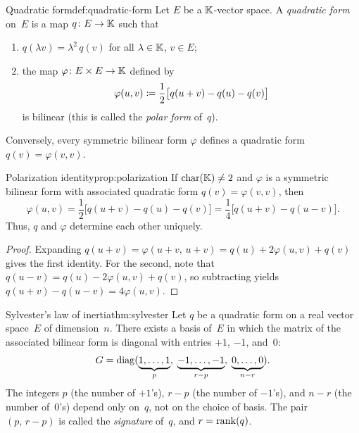 \begin{definition}{Quadratic form}{def:quadratic-form}
Let $E$ be a ${\mathbb{K}}$-vector space.  A \emph{quadratic form} on~$E$ is a
map $q\colon E\to{\mathbb{K}}$ such that
\begin{enumerate}[label=(\roman*)]
  \item $q(\lambda v) = \lambda^2\, q(v)$ for all $\lambda\in{\mathbb{K}}$,
    $v\in E$;
  \item the map $\varphi\colon E\times E\to{\mathbb{K}}$ defined by
    \[
      \varphi(u,v) \coloneqq \frac{1}{2}\bigl[q(u+v) - q(u) - q(v)\bigr]
    \]
    is bilinear (this is called the \emph{polar form}
    of~$q$).
\end{enumerate}
Conversely, every symmetric bilinear form $\varphi$ defines a quadratic
form $q(v) = \varphi(v,v)$.
\end{definition}

\begin{proposition}{Polarization identity}{prop:polarization}
If $\operatorname{char}({\mathbb{K}})\neq 2$ and $\varphi$ is a symmetric bilinear form with
associated quadratic form $q(v) = \varphi(v,v)$, then
\[
  \varphi(u,v) = \frac{1}{2}\bigl[q(u+v) - q(u) - q(v)\bigr]
    = \frac{1}{4}\bigl[q(u+v) - q(u-v)\bigr].
\]
Thus, $q$ and $\varphi$ determine each other uniquely.
\end{proposition}

\begin{proof}
Expanding $q(u+v) = \varphi(u+v,\,u+v) = q(u) + 2\varphi(u,v) + q(v)$
gives the first identity.  For the second, note that
$q(u-v) = q(u) - 2\varphi(u,v) + q(v)$, so subtracting yields
$q(u+v) - q(u-v) = 4\varphi(u,v)$.
\end{proof}

\begin{theorem}{Sylvester's law of inertia}{thm:sylvester}
Let $q$ be a quadratic form on a real vector space~$E$ of
dimension~$n$.  There exists a basis of~$E$ in which the matrix of the
associated bilinear form is diagonal with entries $+1$, $-1$, and~$0$:
\[
  G = \operatorname{diag}(\underbrace{1,\ldots,1}_{p},\;
    \underbrace{-1,\ldots,-1}_{r-p},\;
    \underbrace{0,\ldots,0}_{n-r}).
\]
The integers $p$ (the number of $+1$'s), $r-p$ (the number of $-1$'s),
and $n-r$ (the number of~$0$'s) depend only on~$q$, not on the choice
of basis.  The pair $(p,\,r-p)$ is called the \emph{signature} of~$q$,
and $r = \operatorname{rank}(q)$.
\end{theorem}

